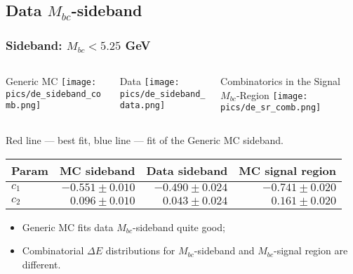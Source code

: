 \documentclass[10 pt,compress,mathserif]{beamer}
\begin{document}
\subsection{Data $M_{bc}$-sideband}
\begin{frame}
 \frametitle{Sideband: $M_{bc}<5.25$ GeV}
 \begin{tiny}
 \begin{columns}
  \begin{column}{0.33\textwidth}
  \begin{center}
  Generic MC
   \texttt{[image: pics/de\_sideband\_comb.png]}
   \end{center}
  \end{column}
  \begin{column}{0.33\textwidth}
  \begin{center}
  Data
   \texttt{[image: pics/de\_sideband\_data.png]}
   \end{center}
  \end{column}
  \begin{column}{0.33\textwidth}
  \begin{center}
  Combinatorics in the Signal $M_{bc}$-Region
   \texttt{[image: pics/de\_sr\_comb.png]}
   \end{center}
  \end{column}
 \end{columns}
 \begin{center}
  Red line --- best fit, blue line --- fit of the Generic MC sideband.
 \end{center}
\end{tiny}

\begin{small}
 \begin{table}[bt]
 \small
 \begin{tabular}{|l|r|r|r|} \hline
 Param &    MC sideband    & Data sideband & MC signal region \\ \hline
$c_1$  &$-0.551 \pm 0.010$ & $-0.490 \pm 0.024$ &$-0.741 \pm 0.020$ \\ \hline
$c_2$  &$ 0.096 \pm 0.010$ & $ 0.043 \pm 0.024$ &$ 0.161 \pm 0.020$ \\ \hline
 \end{tabular}
 \end{table}

 \begin{itemize}
  \item Generic MC fits data $M_{bc}$-sideband quite good;
  \item Combinatorial $\Delta E$ distributions for $M_{bc}$-sideband and $M_{bc}$-signal region are different.
 \end{itemize}
\end{small}
\end{frame}
\end{document}
